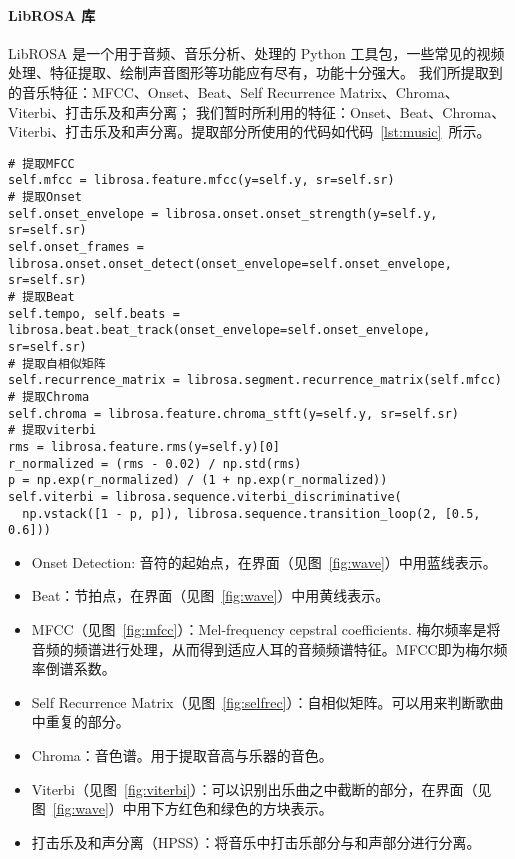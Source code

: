 \documentclass[a4paper,utf8,10pt]{article}
\newcommand{\sept}{\setlength\itemsep{-4pt}}
\begin{document}
\paragraph{LibROSA 库} LibROSA 是一个用于音频、音乐分析、处理的 Python 工具包，一些常见的视频处理、特征提取、绘制声音图形等功能应有尽有，功能十分强大。
我们所提取到的音乐特征：MFCC、Onset、Beat、Self Recurrence Matrix、Chroma、Viterbi、打击乐及和声分离；
我们暂时所利用的特征：Onset、Beat、Chroma、Viterbi、打击乐及和声分离。提取部分所使用的代码如代码~\ref{lst:music}~所示。
 \label{lst:music}
\begin{verbatim}
# 提取MFCC
self.mfcc = librosa.feature.mfcc(y=self.y, sr=self.sr)
# 提取Onset
self.onset_envelope = librosa.onset.onset_strength(y=self.y, sr=self.sr)
self.onset_frames = librosa.onset.onset_detect(onset_envelope=self.onset_envelope, sr=self.sr)
# 提取Beat
self.tempo, self.beats = librosa.beat.beat_track(onset_envelope=self.onset_envelope, sr=self.sr)
# 提取自相似矩阵
self.recurrence_matrix = librosa.segment.recurrence_matrix(self.mfcc)
# 提取Chroma
self.chroma = librosa.feature.chroma_stft(y=self.y, sr=self.sr)
# 提取viterbi
rms = librosa.feature.rms(y=self.y)[0]
r_normalized = (rms - 0.02) / np.std(rms)
p = np.exp(r_normalized) / (1 + np.exp(r_normalized))
self.viterbi = librosa.sequence.viterbi_discriminative(
  np.vstack([1 - p, p]), librosa.sequence.transition_loop(2, [0.5, 0.6]))
\end{verbatim}

\begin{itemize}
  \sept
  \item Onset Detection: 音符的起始点，在界面（见图~\ref{fig:wave}）中用蓝线表示。
  \item Beat：节拍点，在界面（见图~\ref{fig:wave}）中用黄线表示。
  \item MFCC（见图~\ref{fig:mfcc}）：Mel-frequency cepstral coefficients. 梅尔频率是将音频的频谱进行处理，从而得到适应人耳的音频频谱特征。MFCC即为梅尔频率倒谱系数。
  \item Self Recurrence Matrix（见图~\ref{fig:selfrec}）：自相似矩阵。可以用来判断歌曲中重复的部分。
  \item Chroma：音色谱。用于提取音高与乐器的音色。
  \item Viterbi（见图~\ref{fig:viterbi}）：可以识别出乐曲之中截断的部分，在界面（见图~\ref{fig:wave}）中用下方红色和绿色的方块表示。
  \item 打击乐及和声分离（HPSS）：将音乐中打击乐部分与和声部分进行分离。
\end{itemize}
\end{document}
